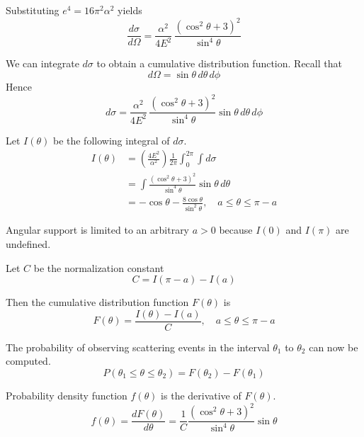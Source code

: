 \documentclass[12pt]{article}
\begin{document}
\noindent
Substituting $e^4=16\pi^2\alpha^2$ yields
\begin{equation*}
\frac{d\sigma}{d\Omega}=\frac{\alpha^2}{4E^2}\,\frac{\left(\cos^2\theta+3\right)^2}{\sin^4\theta}
\end{equation*}

\noindent
We can integrate $d\sigma$ to obtain a cumulative distribution function.
Recall that
\begin{equation*}
d\Omega=\sin\theta\,d\theta\,d\phi
\end{equation*}
Hence
\begin{equation*}
d\sigma=\frac{\alpha^2}{4E^2}\,\frac{\left(\cos^2\theta+3\right)^2}{\sin^4\theta}\sin\theta\,d\theta\,d\phi
\end{equation*}

\noindent
Let $I(\theta)$ be the following integral of $d\sigma$.
\begin{align*}
I(\theta)&=\left(\frac{4E^2}{\alpha^2}\right)\frac{1}{2\pi}\int_0^{2\pi}\int d\sigma
\\
&=\int\frac{\left(\cos^2\theta+3\right)^2}{\sin^4\theta}\sin\theta\,d\theta
\\
&=-\cos\theta-\frac{8\cos\theta}{\sin^2\theta},
\quad a\le\theta\le\pi-a
\end{align*}

\noindent
Angular support is limited to an arbitrary $a>0$ because $I(0)$ and $I(\pi)$ are undefined.

\bigskip
\noindent
Let $C$ be the normalization constant
\begin{equation*}
C=I(\pi-a)-I(a)
\end{equation*}

\noindent
Then the cumulative distribution function $F(\theta)$ is
\begin{equation*}
F(\theta)=\frac{I(\theta)-I(a)}{C},\quad a\le\theta\le\pi-a
\end{equation*}

\noindent
The probability of observing scattering events in the interval $\theta_1$ to $\theta_2$
can now be computed.
\begin{equation*}
P(\theta_1\le\theta\le\theta_2)=F(\theta_2)-F(\theta_1)
\end{equation*}

\noindent
Probability density function $f(\theta)$ is the derivative of $F(\theta)$.
\begin{equation*}
f(\theta)
=\frac{dF(\theta)}{d\theta}
=\frac{1}{C}\frac{\left(\cos^2\theta+3\right)^2}{\sin^4\theta}\sin\theta
\end{equation*}
\end{document}
